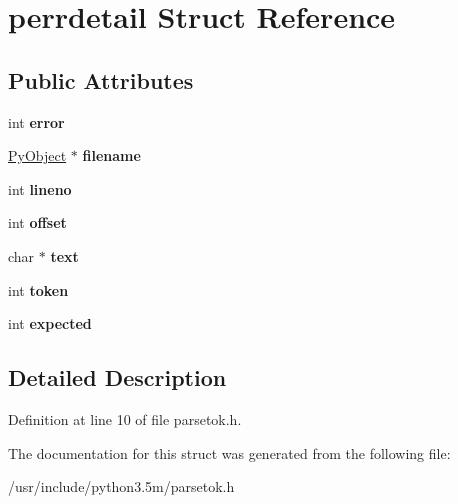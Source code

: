 \hypertarget{structperrdetail}{}\section{perrdetail Struct Reference}
\label{structperrdetail}
\subsection*{Public Attributes}
\begin{DoxyCompactItemize}
\item 
int {\bfseries error}\hypertarget{structperrdetail_ab80f68a217bb2600e8b52959696f1f3d}{}\label{structperrdetail_ab80f68a217bb2600e8b52959696f1f3d}

\item 
\hyperlink{struct__object}{Py\+Object} $\ast$ {\bfseries filename}\hypertarget{structperrdetail_af0f0cceca9635472b1a3eec491e5a20e}{}\label{structperrdetail_af0f0cceca9635472b1a3eec491e5a20e}

\item 
int {\bfseries lineno}\hypertarget{structperrdetail_aca39ca397cdfe195a49eabf79010262a}{}\label{structperrdetail_aca39ca397cdfe195a49eabf79010262a}

\item 
int {\bfseries offset}\hypertarget{structperrdetail_acb64a7271e6ebe6c57791b152bbfed19}{}\label{structperrdetail_acb64a7271e6ebe6c57791b152bbfed19}

\item 
char $\ast$ {\bfseries text}\hypertarget{structperrdetail_a02597d5aafb6886943176ce749f77e1c}{}\label{structperrdetail_a02597d5aafb6886943176ce749f77e1c}

\item 
int {\bfseries token}\hypertarget{structperrdetail_a37c1a341622c0f1e2d3d6968d1008472}{}\label{structperrdetail_a37c1a341622c0f1e2d3d6968d1008472}

\item 
int {\bfseries expected}\hypertarget{structperrdetail_a93f70b9ef5490df737d24e47fb99716e}{}\label{structperrdetail_a93f70b9ef5490df737d24e47fb99716e}

\end{DoxyCompactItemize}


\subsection{Detailed Description}


Definition at line 10 of file parsetok.\+h.



The documentation for this struct was generated from the following file\+:\begin{DoxyCompactItemize}
\item 
/usr/include/python3.\+5m/parsetok.\+h\end{DoxyCompactItemize}
